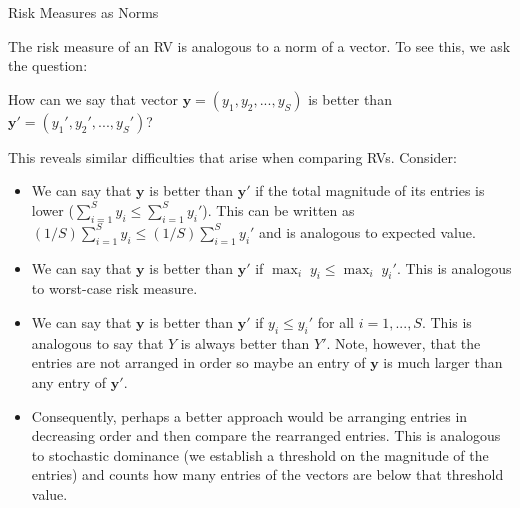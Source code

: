 \documentclass[9pt]{beamer}
\begin{document}
%
\begin{frame}{Risk Measures as Norms}

The risk measure of an RV is analogous to a norm of a vector. To see this, we ask the question:
\begin{block}{}
How can we say that vector $\mathbf{y}=(y_1,y_2,...,y_S)$ is better than $\mathbf{y}'=(y_1',y_2',...,y_S')$?
\end{block}
This reveals similar difficulties that arise when comparing RVs. Consider:
\begin{itemize}

\item We can say that $\mathbf{y} $ is better than $\mathbf{y}'$ if the total magnitude of its entries is lower ($\sum_{i=1}^Sy_i\leq \sum_{i=1}^Sy_i'$). This can be written as $(1/S)\sum_{i=1}^Sy_i\leq (1/S)\sum_{i=1}^Sy_i'$  and is analogous to expected value.

\item We can say that $\mathbf{y} $ is better than $\mathbf{y}'$ if $\max_i\; y_i\leq \max_i\; y_i'$. This is analogous to worst-case risk measure. 

\item  We can  say that $\mathbf{y}$ is better than $\mathbf{y}'$ if $y_i\leq y_i'$ for all $i=1,...,S$. This is analogous to say that $Y$ is always better than $Y'$.  Note, however, that the entries are not arranged in order so maybe an entry of $\mathbf{y}$ is much larger than any entry of $\mathbf{y}'$.  

\item Consequently, perhaps a better approach would be arranging entries in decreasing order and then compare the rearranged entries.  This is analogous to stochastic dominance (we establish a threshold on the magnitude of the entries) and counts how many entries of the vectors are below that threshold value.  

\end{itemize}



\end{frame}
\end{document}
